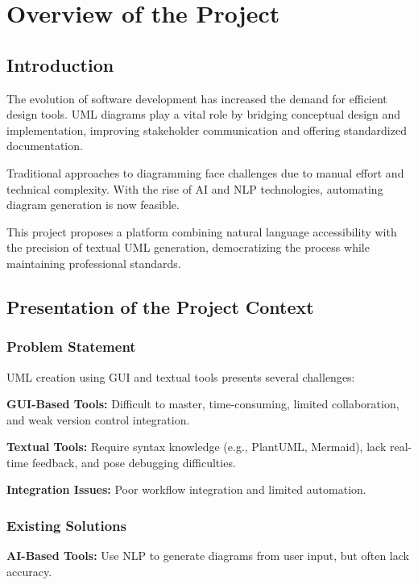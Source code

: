 \chapter[Overview]{Overview of the Project}

\section{Introduction}

The evolution of software development has increased the demand for efficient design tools. UML diagrams play a vital role by bridging conceptual design and implementation, improving stakeholder communication and offering standardized documentation.

Traditional approaches to diagramming face challenges due to manual effort and technical complexity. With the rise of AI and NLP technologies, automating diagram generation is now feasible.

This project proposes a platform combining natural language accessibility with the precision of textual UML generation, democratizing the process while maintaining professional standards.

\section{Presentation of the Project Context}

\subsection{Problem Statement}

UML creation using GUI and textual tools presents several challenges:

\textbf{GUI-Based Tools:} Difficult to master, time-consuming, limited collaboration, and weak version control integration.

\textbf{Textual Tools:} Require syntax knowledge (e.g., PlantUML, Mermaid), lack real-time feedback, and pose debugging difficulties.

\textbf{Integration Issues:} Poor workflow integration and limited automation.

\subsection{Existing Solutions}

\textbf{AI-Based Tools:} Use NLP to generate diagrams from user input, but often lack accuracy.

